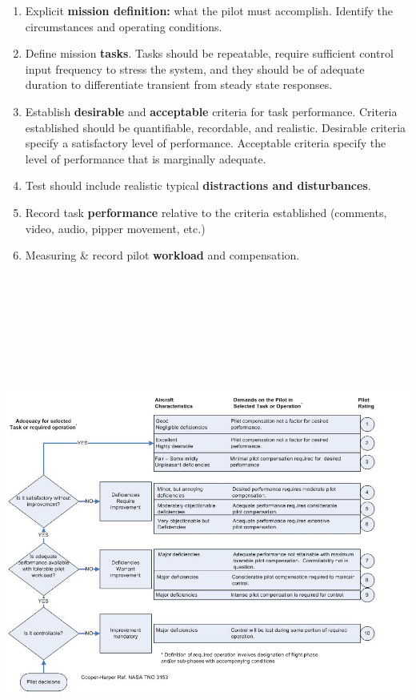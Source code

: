 \documentclass[
]{book}
\providecommand{\tightlist}{%
  \setlength{\itemsep}{0pt}\setlength{\parskip}{0pt}}
\begin{document}
\begin{enumerate}
\def\labelenumi{\arabic{enumi}.}
\tightlist
\item
  Explicit \textbf{mission definition:} what the pilot must accomplish. Identify
  the circumstances and operating conditions.
\item
  Define mission \textbf{tasks}. Tasks should be repeatable, require sufficient
  control input frequency to stress the system, and they should be of adequate
  duration to differentiate transient from steady state responses.
\item
  Establish \textbf{desirable} and \textbf{acceptable} criteria for task performance.
  Criteria established should be quantifiable, recordable, and realistic.
  Desirable criteria specify a satisfactory level of performance. Acceptable
  criteria specify the level of performance that is marginally adequate.
\item
  Test should include realistic typical \textbf{distractions and disturbances}.
\item
  Record task \textbf{performance} relative to the criteria established (comments,
  video, audio, pipper movement, etc.)
\item
  Measuring \& record pilot \textbf{workload} and compensation.
\end{enumerate}

\includegraphics[width=8.48681in,height=6.97361in]{media/15/image5.jpeg}
\end{document}
